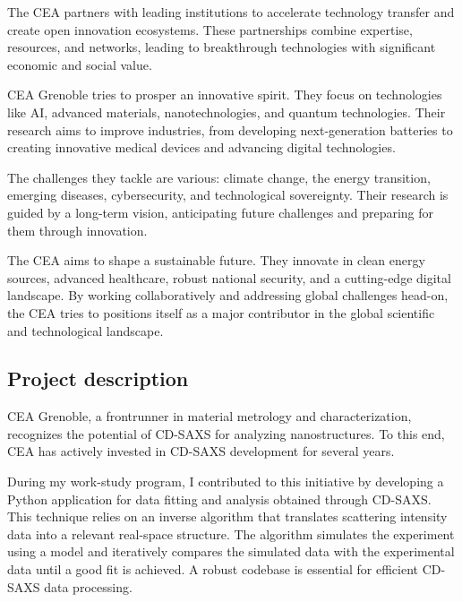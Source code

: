 \medskip

The CEA partners with leading institutions to accelerate technology transfer and create open innovation ecosystems. 
 These partnerships combine expertise, resources, and networks, leading to breakthrough technologies with significant 
 economic and social value.

\medskip

CEA Grenoble tries to prosper an innovative spirit. They focus on technologies like AI, advanced materials,
 nanotechnologies, and quantum technologies. Their research aims to improve industries, from
 developing next-generation batteries to creating innovative medical devices and advancing digital technologies.

\medskip

The challenges they tackle are various: climate change, the energy transition, emerging diseases, cybersecurity, and 
technological sovereignty. Their research is guided by a long-term vision, anticipating future challenges and preparing 
for them through innovation.

\medskip

The CEA aims to shape a sustainable future. They innovate in clean energy sources, 
advanced healthcare, robust national security, and a cutting-edge digital landscape. By working collaboratively and addressing
 global challenges head-on, the CEA tries to positions itself as a major contributor in the global scientific and technological landscape.

\medskip

\subsection{Project description}

\medskip
CEA Grenoble, a frontrunner in material metrology and characterization, recognizes the potential
 of CD-SAXS for analyzing nanostructures. To this end, CEA has actively invested in CD-SAXS development for several years.

\medskip

During my work-study program, I contributed to this initiative by developing a Python application
 for data fitting and analysis obtained through CD-SAXS. This technique relies on an inverse 
 algorithm that translates scattering intensity data into a relevant real-space structure. The 
 algorithm simulates the experiment using a model and iteratively compares the simulated data 
 with the experimental data until a good fit is achieved. A robust codebase is essential for 
 efficient CD-SAXS data processing.

